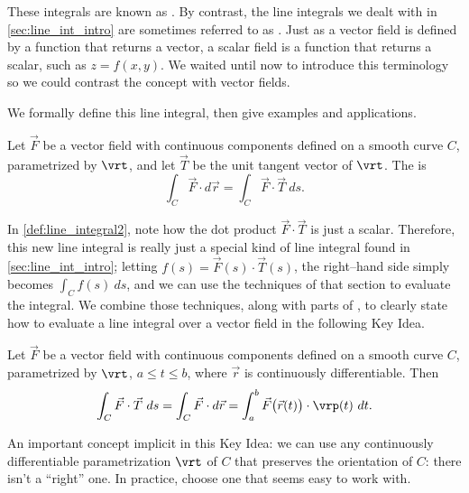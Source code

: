 These integrals are known as . By contrast, the line integrals we dealt with in \autoref{sec:line_int_intro} are sometimes referred to as . Just as a vector field is defined by a function that returns a vector, a scalar field is a function that returns a scalar, such as $z = f(x,y)$. We waited until now to introduce this terminology so we could contrast the concept with vector fields. 

We formally define this line integral, then give examples and applications.

{Let $\vec F$ be a vector field with continuous components defined on a smooth curve $C$, parametrized by $\vrt$, and let $\vec T$ be the unit tangent vector of $\vrt$. The  is
\[\int_C \vec F\cdot d\vec r = \int_C \vec F\cdot\vec T\ ds.\]}


In \autoref{def:line_integral2}, note how the dot product $\vec F \cdot \vec T$ is just a scalar. %
Therefore, this new line integral is really just a special kind of line integral found in \autoref{sec:line_int_intro}; letting $f(s) = \vec F(s)\cdot \vec T(s)$, the right--hand side simply becomes $\int_C f(s)\ ds$, and we can use the techniques of that section to evaluate the integral. We combine those techniques, along with parts of , to clearly state how to evaluate a line integral over a vector field in the following Key Idea. 

{Let $\vec F$ be a vector field with continuous components defined on a smooth curve $C$, parametrized by $\vrt$, $a\leq t\leq b$, where $\vec r$ is continuously differentiable. Then
	\[
	\int_C\vec F\cdot\vec T\ ds = \int_C \vec F\cdot d\vec r
	=\int_a^b \vec F\big(\vec r(t)\big) \cdot \vrp(t)\ dt.
	\]}

An important concept implicit in this Key Idea: we can use any continuously differentiable parametrization $\vrt$ of $C$ that preserves the orientation of $C$: there isn't a ``right'' one. In practice, choose one that seems easy to work with. 

